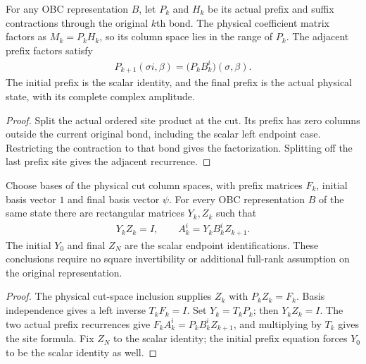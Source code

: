 \begin{lemma}
    \label{lem:obc_original_boundary_factors}
    \leanok
    For any OBC representation $B$, let $P_k$ and $H_k$ be its actual
    prefix and suffix contractions through the original $k$th bond.
    The physical coefficient matrix factors as $M_k=P_kH_k$, so its
    column space lies in the range of $P_k$. The adjacent prefix
    factors satisfy
    \begin{align}
        P_{k+1}(\sigma i,\beta)
        =\bigl(P_kB_k^i\bigr)(\sigma,\beta).
    \end{align}
    The initial prefix is the scalar identity, and the final prefix is
    the actual physical state, with its complete complex amplitude.
\end{lemma}
\begin{proof}
    \leanok
    Split the actual ordered site product at the cut. Its prefix has
    zero columns outside the current original bond, including the
    scalar left endpoint case. Restricting the contraction to that bond
    gives the factorization. Splitting off the last prefix site gives
    the adjacent recurrence.
\end{proof}

\begin{lemma}
    \label{lem:obc_rectangular_cut_maps}
    \leanok
    Choose bases of the physical cut column spaces, with prefix matrices
    $F_k$, initial basis vector $1$ and final basis vector $\psi$. For
    every OBC representation $B$ of the same state there are rectangular
    matrices $Y_k,Z_k$ such that
    \begin{align}
        Y_kZ_k=I,\qquad
        A_k^i=Y_kB_k^iZ_{k+1}.
    \end{align}
    The initial $Y_0$ and final $Z_N$ are the scalar endpoint
    identifications. These conclusions require no square invertibility
    or additional full-rank assumption on the original representation.
\end{lemma}
\begin{proof}
    \leanok
    The physical cut-space inclusion supplies $Z_k$ with $P_kZ_k=F_k$.
    Basis independence gives a left inverse $T_kF_k=I$. Set $Y_k=T_kP_k$;
    then $Y_kZ_k=I$. The two actual prefix recurrences give
    $F_kA_k^i=P_kB_k^iZ_{k+1}$, and multiplying by $T_k$ gives the
    site formula. Fix $Z_N$ to the scalar identity; the initial prefix
    equation forces $Y_0$ to be the scalar identity as well.
\end{proof}


